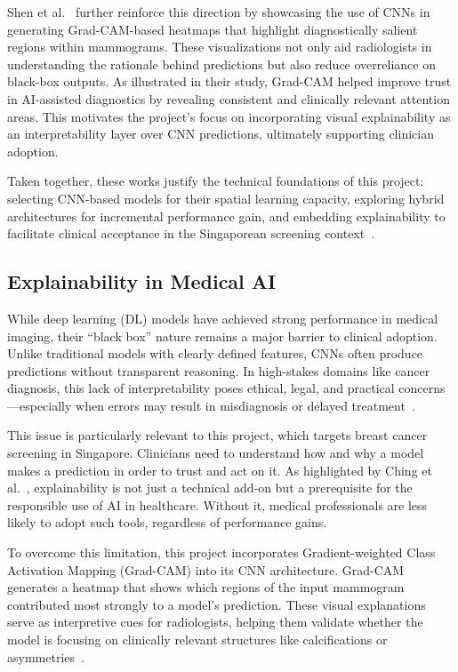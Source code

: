 \documentclass[12pt]{article}
\begin{document}
Shen et al.~\cite{7} further reinforce this direction by showcasing the use of CNNs in generating Grad-CAM-based heatmaps that highlight diagnostically salient regions within mammograms. These visualizations not only aid radiologists in understanding the rationale behind predictions but also reduce overreliance on black-box outputs. As illustrated in their study, Grad-CAM helped improve trust in AI-assisted diagnostics by revealing consistent and clinically relevant attention areas. This motivates the project's focus on incorporating visual explainability as an interpretability layer over CNN predictions, ultimately supporting clinician adoption.

Taken together, these works justify the technical foundations of this project: selecting CNN-based models for their spatial learning capacity, exploring hybrid architectures for incremental performance gain, and embedding explainability to facilitate clinical acceptance in the Singaporean screening context~\cite{1,6,7}.

\subsection{Explainability in Medical AI}

While deep learning (DL) models have achieved strong performance in medical imaging, their “black box” nature remains a major barrier to clinical adoption. Unlike traditional models with clearly defined features, CNNs often produce predictions without transparent reasoning. In high-stakes domains like cancer diagnosis, this lack of interpretability poses ethical, legal, and practical concerns—especially when errors may result in misdiagnosis or delayed treatment~\cite{3}.

This issue is particularly relevant to this project, which targets breast cancer screening in Singapore. Clinicians need to understand how and why a model makes a prediction in order to trust and act on it. As highlighted by Ching et al.~\cite{3}, explainability is not just a technical add-on but a prerequisite for the responsible use of AI in healthcare. Without it, medical professionals are less likely to adopt such tools, regardless of performance gains.

To overcome this limitation, this project incorporates Gradient-weighted Class Activation Mapping (Grad-CAM) into its CNN architecture. Grad-CAM generates a heatmap that shows which regions of the input mammogram contributed most strongly to a model’s prediction. These visual explanations serve as interpretive cues for radiologists, helping them validate whether the model is focusing on clinically relevant structures like calcifications or asymmetries~\cite{5}.
\end{document}

